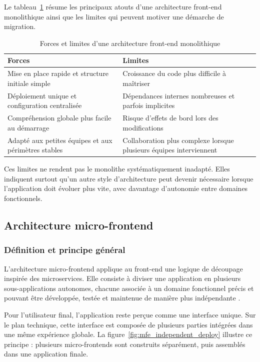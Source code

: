 Le tableau~\ref{tab:forces-limites-monolithe} résume les principaux atouts d'une architecture front-end monolithique ainsi que les limites qui peuvent motiver une démarche de migration.

\begingroup
\renewcommand{\arraystretch}{1.25}
\begin{longtable}{|p{6.8cm}|p{6.8cm}|}
\caption{Forces et limites d'une architecture front-end monolithique}\label{tab:forces-limites-monolithe}\\
\hline
\textbf{Forces} & \textbf{Limites} \\
\hline
Mise en place rapide et structure initiale simple & Croissance du code plus difficile à maîtriser \\
\hline
Déploiement unique et configuration centralisée & Dépendances internes nombreuses et parfois implicites \\
\hline
Compréhension globale plus facile au démarrage & Risque d'effets de bord lors des modifications \\
\hline
Adapté aux petites équipes et aux périmètres stables & Collaboration plus complexe lorsque plusieurs équipes interviennent \\
\hline
\end{longtable}
\endgroup

Ces limites ne rendent pas le monolithe systématiquement inadapté. Elles indiquent surtout qu'un autre style d'architecture peut devenir nécessaire lorsque l'application doit évoluer plus vite, avec davantage d'autonomie entre domaines fonctionnels.

\subsection{Architecture micro-frontend}

\subsubsection{Définition et principe général}

L'architecture micro-frontend applique au front-end une logique de découpage inspirée des microservices. Elle consiste à diviser une application en plusieurs sous-applications autonomes, chacune associée à un domaine fonctionnel précis et pouvant être développée, testée et maintenue de manière plus indépendante \cite{single_spa_microfrontend}.

Pour l'utilisateur final, l'application reste perçue comme une interface unique. Sur le plan technique, cette interface est composée de plusieurs parties intégrées dans une même expérience globale. La figure~\ref{fig:mfe_independent_deploy} illustre ce principe : plusieurs micro-frontends sont construits séparément, puis assemblés dans une application finale.

